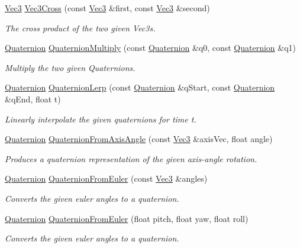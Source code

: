 \begin{DoxyCompactItemize}
\hyperlink{classgofxmath_1_1_vec3}{Vec3} \hyperlink{group___s_i_s_d_vec_math_ga455b2ef17c947a780f2b2b9e4b6cccc8}{Vec3\+Cross} (const \hyperlink{classgofxmath_1_1_vec3}{Vec3} \&first, const \hyperlink{classgofxmath_1_1_vec3}{Vec3} \&second)
\begin{DoxyCompactList}\small\item\em The cross product of the two given Vec3s. \end{DoxyCompactList}\item 
\hyperlink{classgofxmath_1_1_quaternion}{Quaternion} \hyperlink{group___s_i_s_d_vec_math_ga01d5534572884ea932229ccb1aa17ac1}{Quaternion\+Multiply} (const \hyperlink{classgofxmath_1_1_quaternion}{Quaternion} \&q0, const \hyperlink{classgofxmath_1_1_quaternion}{Quaternion} \&q1)
\begin{DoxyCompactList}\small\item\em Multiply the two given Quaternions. \end{DoxyCompactList}\item 
\hyperlink{classgofxmath_1_1_quaternion}{Quaternion} \hyperlink{group___s_i_s_d_vec_math_ga7d4ad4615b2edcd99e9dcf6f0afe74ca}{Quaternion\+Lerp} (const \hyperlink{classgofxmath_1_1_quaternion}{Quaternion} \&q\+Start, const \hyperlink{classgofxmath_1_1_quaternion}{Quaternion} \&q\+End, float t)
\begin{DoxyCompactList}\small\item\em Linearly interpolate the given quaternions for time t. \end{DoxyCompactList}\item 
\hyperlink{classgofxmath_1_1_quaternion}{Quaternion} \hyperlink{group___s_i_s_d_vec_math_gabbc754cd1e171bd2d945376bb8a39a8f}{Quaternion\+From\+Axis\+Angle} (const \hyperlink{classgofxmath_1_1_vec3}{Vec3} \&axis\+Vec, float angle)
\begin{DoxyCompactList}\small\item\em Produces a quaternion representation of the given axis-\/angle rotation. \end{DoxyCompactList}\item 
\hyperlink{classgofxmath_1_1_quaternion}{Quaternion} \hyperlink{group___s_i_s_d_vec_math_ga6ea767e2a30159fd9c671ce16e949e38}{Quaternion\+From\+Euler} (const \hyperlink{classgofxmath_1_1_vec3}{Vec3} \&angles)
\begin{DoxyCompactList}\small\item\em Converts the given euler angles to a quaternion. \end{DoxyCompactList}\item 
\hyperlink{classgofxmath_1_1_quaternion}{Quaternion} \hyperlink{group___s_i_s_d_vec_math_gabcc390d952d7b142babc93c6faadef79}{Quaternion\+From\+Euler} (float pitch, float yaw, float roll)
\begin{DoxyCompactList}\small\item\em Converts the given euler angles to a quaternion. \end{DoxyCompactList}\end{DoxyCompactItemize}

